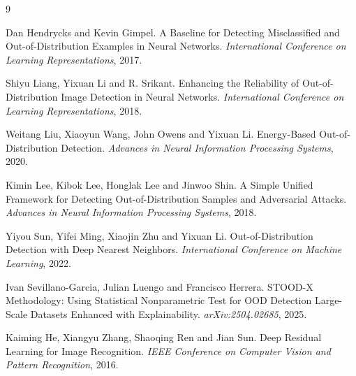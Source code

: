 \documentclass[11pt,a4paper]{article}
\begin{document}
\begin{thebibliography}{9}

Dan Hendrycks and Kevin Gimpel.
\newblock A Baseline for Detecting Misclassified and Out-of-Distribution Examples in Neural Networks.
\newblock \emph{International Conference on Learning Representations}, 2017.

Shiyu Liang, Yixuan Li and R. Srikant.
\newblock Enhancing the Reliability of Out-of-Distribution Image Detection in Neural Networks.
\newblock \emph{International Conference on Learning Representations}, 2018.

Weitang Liu, Xiaoyun Wang, John Owens and Yixuan Li.
\newblock Energy-Based Out-of-Distribution Detection.
\newblock \emph{Advances in Neural Information Processing Systems}, 2020.

Kimin Lee, Kibok Lee, Honglak Lee and Jinwoo Shin.
\newblock A Simple Unified Framework for Detecting Out-of-Distribution Samples and Adversarial Attacks.
\newblock \emph{Advances in Neural Information Processing Systems}, 2018.

Yiyou Sun, Yifei Ming, Xiaojin Zhu and Yixuan Li.
\newblock Out-of-Distribution Detection with Deep Nearest Neighbors.
\newblock \emph{International Conference on Machine Learning}, 2022.

Ivan Sevillano-Garcia, Julian Luengo and Francisco Herrera.
\newblock STOOD-X Methodology: Using Statistical Nonparametric Test for OOD Detection Large-Scale Datasets Enhanced with Explainability.
\newblock \emph{arXiv:2504.02685}, 2025.

Kaiming He, Xiangyu Zhang, Shaoqing Ren and Jian Sun.
\newblock Deep Residual Learning for Image Recognition.
\newblock \emph{IEEE Conference on Computer Vision and Pattern Recognition}, 2016.

\end{thebibliography}
\end{document}
